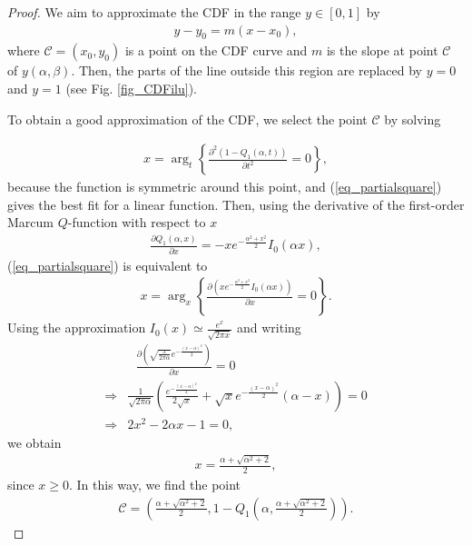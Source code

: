 \begin{proof}

We aim to approximate the CDF in the range $y \in [0, 1]$ by 
\begin{align}\label{eq_YY}
    y-y_0 = m(x-x_0),
\end{align}
where $\mathcal{C} = (x_0,y_0)$ is a point on the CDF curve and $m$ is the slope at point $\mathcal{C}$ of $y(\alpha,\beta)$. Then, the parts of the line outside this region are replaced by $y=0$ and $y=1$ (see Fig. \ref{fig_CDFilu}).

To obtain a good approximation of the CDF, we select the point $\mathcal{C}$ by solving

\begin{align}\label{eq_partialsquare}
   x = \mathop{\arg}_{t} \left\{  \frac{\partial^2\left(1-Q_1(\alpha,t)\right)}{\partial t^2} = 0\right\},
\end{align}
because the function is symmetric around this point, and (\ref{eq_partialsquare}) gives the best fit for a linear function. Then, using the derivative of the first-order Marcum $Q$-function with respect to $x$ \cite[Eq. (2)]{Pratt1968PIpartial}
\begin{align}\label{eq_derivativeMarcumQ}
    \frac{\partial Q_1(\alpha,x)}{\partial x} = -x e^{-\frac{\alpha^2+x^2}{2}}I_0(\alpha x),
\end{align}
(\ref{eq_partialsquare}) is equivalent to 
\begin{align}
   x =  \mathop{\arg}_{x} \left\{\frac{\partial\left(x e^{-\frac{\alpha^2+x^2}{2}}I_0(\alpha x)\right)}{\partial x}=0\right\}.
\end{align}
Using the approximation $I_0(x) \simeq \frac{e^x}{\sqrt{2\pi x}} $ \cite[Eq. (9.7.1)]{abramowitz1999ia} and writing
\begin{align}
    &~~~\frac{\partial\left(\sqrt{\frac{x}{2\pi \alpha}}e^{-\frac{(x-\alpha)^2}{2}}\right)}{\partial x} = 0\nonumber\\
   \Rightarrow &\frac{1}{\sqrt{2\pi\alpha}}\left(\frac{e^{-\frac{(x-\alpha)^2}{2}}}{2\sqrt{x}}+\sqrt{x}e^{-\frac{(x-\alpha)^2}{2}}(\alpha-x)\right)  = 0\nonumber\\
    \Rightarrow &2x^2-2\alpha x-1 =0,
\end{align}
we obtain 
\begin{align}\label{eq_beta0}
    x = \frac{\alpha+\sqrt{\alpha^2+2}}{2},
\end{align}
since $x\geq0$. In this way, we find the point 
\begin{align}
    \mathcal{C}=\left(\frac{\alpha+\sqrt{\alpha^2+2}}{2}, 1-Q_1\left(\alpha,\frac{\alpha+\sqrt{\alpha^2+2}}{2}\right)\right).
\end{align}


\end{proof}
